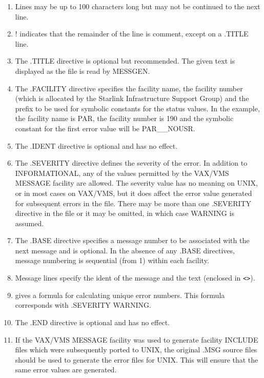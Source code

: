 \documentclass[11pt,nolof]{starlink}
\begin{document}
\begin{enumerate}
\item Lines may be up to 100 characters long but may not be continued to the
next line.
\item ! indicates that the remainder
of the line is comment, except on a .TITLE line.
\item The .TITLE directive is optional but recommended. The given text is
displayed as the file is read by MESSGEN.
\item The .FACILITY directive specifies the facility name, the facility number
(which is allocated by the Starlink Infrastructure Support Group) and the
prefix to be used for symbolic constants for the status values.
In the example, the facility name is PAR, the facility number is 190 and the
symbolic constant for the first error value will be PAR\_\_NOUSR.
\item The .IDENT directive is optional and has no effect.
\item The .SEVERITY directive defines the severity of the error. In addition
to INFORMATIONAL, any of the values permitted by the VAX/VMS MESSAGE facility
are allowed.
The severity value has no meaning on UNIX, or in most cases on VAX/VMS, but
it does affect the error value generated for subsequent errors in the file.
There may be more than one .SEVERITY directive in the file or it may be omitted,
in which case WARNING is assumed.
\item The .BASE directive specifies a message number to be associated with
the next message and is optional.
In the absence of any .BASE directives, message numbering is sequential
(from 1) within each facility.
\item Message lines specify the ident of the message and the text
(enclosed in \verb!<>!).
\item
{}
gives a formula for calculating unique error numbers. This formula
corresponds with .SEVERITY WARNING.
\item The .END directive is optional and has no effect.
\item If the VAX/VMS MESSAGE facility was used to generate facility INCLUDE
files which were subsequently ported to UNIX, the original
.MSG source files should be used to generate the error files for UNIX. This
will ensure that the same error values are generated.
\end{enumerate}
\end{document}
